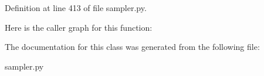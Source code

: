Definition at line 413 of file sampler.\+py.

Here is the caller graph for this function\+:


The documentation for this class was generated from the following file\+:\begin{DoxyCompactItemize}
\item 
sampler.\+py\end{DoxyCompactItemize}
